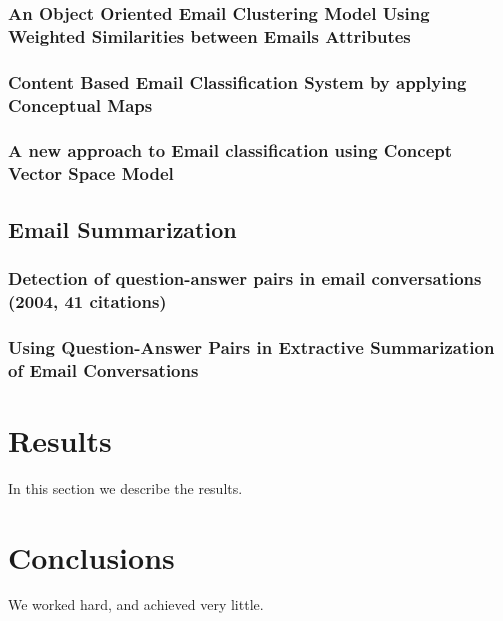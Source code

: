 \documentclass[12pt]{article}
\begin{document}
\subsubsection{An Object Oriented Email Clustering Model Using Weighted Similarities between Emails Attributes}




\subsubsection{Content Based Email Classification System by applying Conceptual Maps}
\subsubsection{A new approach to Email classification using Concept Vector Space Model}

\subsection{Email Summarization}
\subsubsection{Detection of question-answer pairs in email conversations (2004, 41 citations)}
\subsubsection{Using Question-Answer Pairs in Extractive Summarization of Email Conversations}

\section{Results}\label{results}
In this section we describe the results.

\section{Conclusions}\label{conclusions}
We worked hard, and achieved very little.



\end{document}
